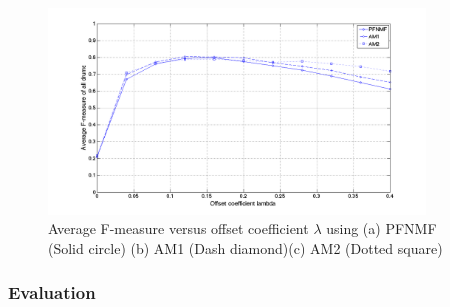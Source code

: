 \documentclass{article}
\begin{document}
\begin{figure}
 \centerline{
 \includegraphics[width=10cm]{thresSelect.png}}
 \caption{Average F-measure versus offset coefficient $\lambda$ using (a) PFNMF (Solid circle) (b) AM1 (Dash diamond)(c) AM2 (Dotted square)}%
 \label{fig:thresTest}
\end{figure}

\subsubsection{Evaluation}\label{subsec:Evaluation}
\end{document}
